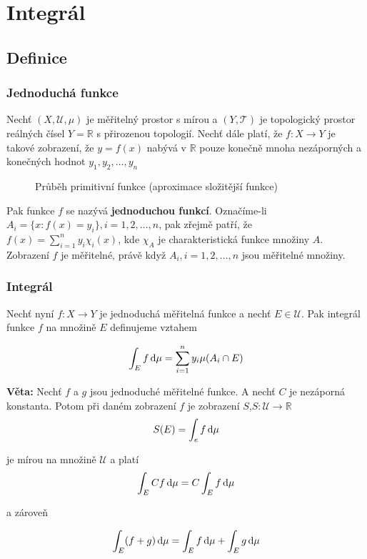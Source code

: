 \chapter{Integrál}
\section{Definice}
\subsection{Jednoduchá funkce}
Nechť $(X,\mathscr{U},\mu)$ je měřitelný prostor s mírou a $(Y,\mathscr{T})$ je topologický prostor reálných čísel $Y=\mathbb{R}$ s přirozenou topologií. Nechť dále platí, že $f:X\to Y$ je takové zobrazení, že $y=f(x)$ nabývá v $\mathbb{R}$ pouze konečně mnoha nezáporných a konečných hodnot $y_1,y_2, \ldots,y_n$

\begin{figure}

\caption{Průběh primitivní funkce (aproximace složitější funkce)}
\end{figure}

Pak funkce $f$ se nazývá \textbf{jednoduchou funkcí}. Označíme-li $A_i=\{x: f(x)=y_i\}, i=1,2,\ldots,n$, pak zřejmě patří, že $f(x)=\sum_{i=1}^n y_i\chi_i(x)$, kde $\chi_A$ je charakteristická funkce množiny $A$. Zobrazení $f$ je měřitelné, právě když $A_i, i=1,2,\ldots,n$ jsou měřitelné množiny.

\subsection{Integrál}
Nechť nyní $f:X\to Y$ je jednoduchá měřitelná funkce a nechť $E\in\mathscr{U}$. Pak integrál funkce $f$ na množině $E$ definujeme vztahem

\[ \int_E f\,\mathrm{d} \mu = \sum_{i=1}^{n}y_i \mu(A_i\cap E) \]

\textbf{Věta:} Nechť $f$ a $g$ jsou jednoduché měřitelné funkce. A nechť $C$ je nezáporná konstanta. Potom při daném zobrazení $f$ je zobrazení $S$,$S:\mathscr{U}\to\mathbb{R}$
\[ S(E) = \int_e f\,\mathrm{d} \mu \]

je mírou na množině $\mathscr{U}$ a platí
\[ \int_E C f\,\mathrm{d} \mu = C\int_E f\,\mathrm{d} \mu \]

a zároveň

\[ \int_E (f+g)\,\mathrm{d} \mu = \int_E f\,\mathrm{d} \mu + \int_E g\,\mathrm{d} \mu \]

